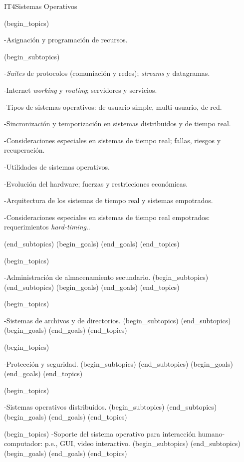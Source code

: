 \begin{BKL2}{IT4}{Sistemas Operativos}
 

(begin_topics)

-Asignación y programación de recursos.

(begin_subtopics)

-{\it Suites} de protocolos (comuniación y redes); {\it streams} y datagramas.

-Internet {\it working} y {\it routing}; servidores y servicios.

-Tipos de sistemas operativos: de usuario simple, multi-usuario, de red.

-Sincronización y temporización en sistemas distribuidos y de tiempo real.

-Consideraciones especiales en sistemas de tiempo real; fallas, riesgos y recuperación.

-Utilidades de sistemas operativos.

-Evolución del hardware; fuerzas y restricciones económicas.

-Arquitectura de los sistemas de tiempo real y sistemas empotrados.

-Consideraciones especiales en sistemas de tiempo real empotrados: requerimientos {\it hard-timing}..

(end_subtopics)
(begin_goals)
(end_goals)
(end_topics)

 

(begin_topics)

-Administración de almacenamiento secundario.
(begin_subtopics)
(end_subtopics)
(begin_goals)
(end_goals)
(end_topics)

 

(begin_topics)

-Sistemas de archivos y de directorios.
(begin_subtopics)
(end_subtopics)
(begin_goals)
(end_goals)
(end_topics)

 

(begin_topics)

-Protección y seguridad.
(begin_subtopics)
(end_subtopics)
(begin_goals)
(end_goals)
(end_topics)

 

(begin_topics)

-Sistemas operativos distribuidos.
(begin_subtopics)
(end_subtopics)
(begin_goals)
(end_goals)
(end_topics)

 

(begin_topics)
-Soporte del sistema operativo para interacción humano-computador: p.e., GUI, video interactivo.
(begin_subtopics)
(end_subtopics)
(begin_goals)
(end_goals)
(end_topics)


\end{BKL2}
